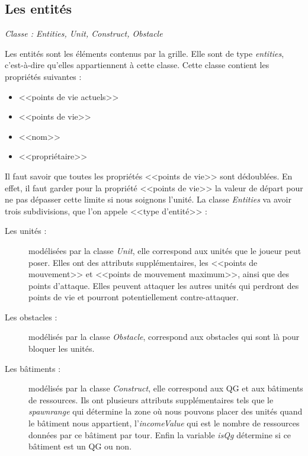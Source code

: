 \documentclass[a4paper,11pt]{report}
\begin{document}
        \subsection{Les entités}
          \begin{center}
           \textit{Classe : Entities, Unit, Construct, Obstacle}
          \end{center}
          Les entités sont les éléments contenus par la grille. Elle sont de type \textit{entities}, c'est-à-dire qu'elles appartiennent à cette classe. Cette classe contient les propriétés suivantes :
          \begin{itemize}
            \item <<points de vie actuels>>
            \item <<points de vie>>
            \item <<nom>>
            \item <<propriétaire>>
          \end{itemize}
          Il faut savoir que toutes les propriétés <<points de vie>> sont dédoublées. En effet, il faut garder pour la propriété <<points de vie>> la valeur de départ pour ne pas dépasser cette limite si nous soignons l'unité.
          La classe \textit{Entities} va avoir trois subdivisions, que l'on appele <<type d'entité>> :
          \begin{description}
            \item[Les unités :] modélisées par la classe \textit{Unit}, elle correspond aux unités que le joueur peut poser. Elles ont des attributs supplémentaires, les <<points de mouvement>> et <<points de mouvement maximum>>, ainsi que des points d'attaque. Elles peuvent attaquer les autres unités qui perdront des points de vie et pourront potentiellement contre-attaquer.
            \item[Les obstacles :] modélisés par la classe \textit{Obstacle}, correspond aux obstacles qui sont là pour bloquer les unités.
            \item[Les bâtiments :] modélisés par la classe \textit{Construct}, elle correspond aux QG et aux bâtiments de ressources. Ils ont plusieurs attributs supplémentaires tels que le \textit{spawnrange} qui détermine la zone où nous pouvons placer des unités quand le bâtiment nous appartient, l'\textit{incomeValue} qui est le nombre de ressources données par ce bâtiment par tour. Enfin la variable \textit{isQg} détermine si ce bâtiment est un QG ou non.
          \end{description}
\end{document}
